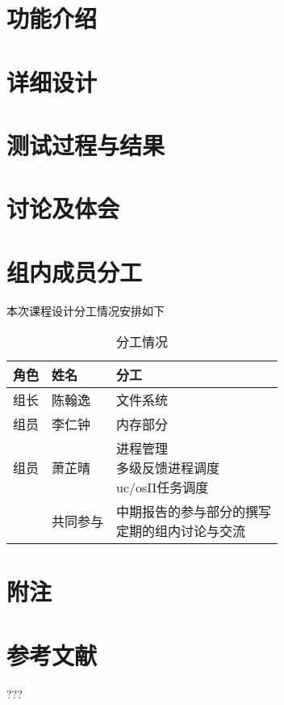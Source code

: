 \chapter{功能介绍}






\chapter{详细设计}






\chapter{测试过程与结果}






\chapter{讨论及体会}


\newpage

\newpage



\chapter{组内成员分工}

本次课程设计分工情况安排如下

\begin{table}[H]
  \centering
  \caption{分工情况}
  \begin{tabular}{|l|l|l|}
    \hline
    角色 & 姓名 & 分工 \\
    \hline
    组长 & 陈翰逸 & 文件系统 \\
    \hline
    组员 & 李仁钟 & 内存部分 \\
    \hline
    组员 & 萧芷晴 & \makecell{进程管理 \\ 多级反馈进程调度 \\ uc/osII任务调度} \\
    \hline
    ~ & 共同参与 & \makecell{中期报告的参与部分的撰写 \\ 定期的组内讨论与交流} \\
    \hline
  \end{tabular}
\end{table}

\chapter{附注}


\chapter{参考文献}

???